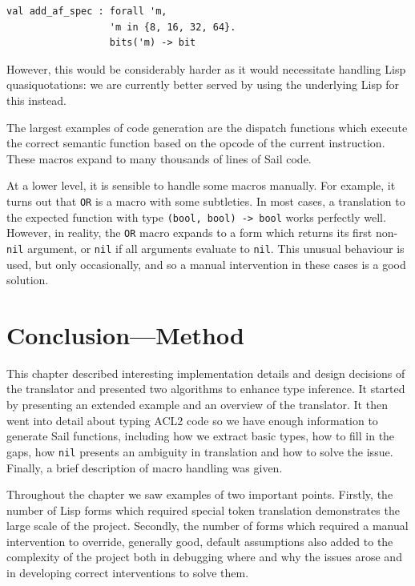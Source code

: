 \documentclass[a4paper,12pt,twoside,openright]{report}
\begin{document}
\begin{minipage}{\linewidth}
\begin{lstlisting}[language=sail]
val add_af_spec : forall 'm,
                  'm in {8, 16, 32, 64}.
                  bits('m) -> bit
\end{lstlisting}
\end{minipage}

However, this would be considerably harder as it would necessitate handling Lisp quasiquotations: we are currently better served by using the underlying Lisp for this instead.

The largest examples of code generation are the dispatch functions which execute the correct semantic function based on the opcode of the current instruction.  These macros expand to many thousands of lines of Sail code.

At a lower level, it is sensible to handle some macros manually.  For example, it turns out that \texttt{OR} is a macro with some subtleties.  In most cases, a translation to the expected function with type \texttt{(bool, bool) -> bool} works perfectly well.  However, in reality, the \texttt{OR} macro expands to a form which returns its first non-\texttt{nil} argument, or \texttt{nil} if all arguments evaluate to \texttt{nil}.  This unusual behaviour is used, but only occasionally, and so a manual intervention in these cases is a good solution.

\section{Conclusion---Method}

This chapter described interesting implementation details and design decisions of the translator and presented two algorithms to enhance type inference.  It started by presenting an extended example and an overview of the translator.  It then went into detail about typing ACL2 code so we have enough information to generate Sail functions, including how we extract basic types, how to fill in the gaps, how \texttt{nil} presents an ambiguity in translation and how to solve the issue.  Finally, a brief description of macro handling was given.

Throughout the chapter we saw examples of two important points.  Firstly, the number of Lisp forms which required special token translation demonstrates the large scale of the project.  Secondly, the number of forms which required a manual intervention to override, generally good, default assumptions also added to the complexity of the project both in debugging where and why the issues arose and in developing correct interventions to solve them.
\end{document}
